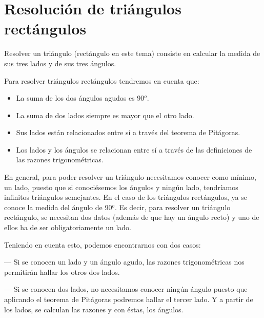 \vspace{1cm}
\section{Resolución de triángulos rectángulos}
\vspace{0.5cm}

Resolver un triángulo (rectángulo en este tema) consiste en calcular la medida de sus tres lados y de sus tres ángulos.


Para resolver triángulos rectángulos  tendremos en cuenta que:

\begin{itemize}
\item La suma de los dos ángulos agudos es 90$^o$.
\item La suma de dos lados siempre es mayor que el otro lado.
\item Sus lados están relacionados entre sí a través del teorema de Pitágoras.  
\item Los lados y los ángulos se relacionan entre sí a través de las definiciones de las razones trigonométricas.
\end{itemize}


En general, para poder resolver un triángulo necesitamos conocer como mínimo, un lado, puesto que si conociésemos los ángulos y ningún lado, tendríamos infinitos triángulos semejantes. En el caso de los triángulos rectángulos, ya se conoce la medida del ángulo de 90$^o$. Es decir, para resolver un triángulo rectángulo, se necesitan dos datos (además de que hay un ángulo recto) y uno de ellos ha de ser obligatoriamente un lado.


Teniendo en cuenta esto, podemos encontrarnos con dos casos:

--- Si se conocen un lado y un ángulo agudo, las razones trigonométricas nos permitirán hallar los otros dos lados.

--- Si se conocen dos lados, no necesitamos conocer ningún ángulo puesto que aplicando el teorema de Pitágoras podremos hallar el tercer lado. Y a partir de los lados, se calculan las razones y con éstas, los ángulos.

